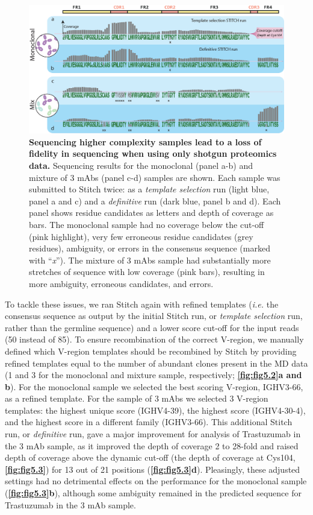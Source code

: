 \begin{figure}[!htb]
  \center
  \includegraphics[]{Chapter.5/Figures/f3.png}
  \caption{\textbf{Sequencing higher complexity samples lead to a loss of fidelity in sequencing when using only shotgun proteomics data.} Sequencing results for the monoclonal (panel a-b) and mixture of 3 mAbs (panel c-d) samples are shown. Each sample was submitted to Stitch twice: as a \emph{template selection} run (light blue, panel a and c) and a \emph{definitive} run (dark blue, panel b and d). Each panel shows residue candidates as letters and depth of coverage as bars. The monoclonal sample had no coverage below the cut-off (pink highlight), very few erroneous residue candidates (grey residues), ambiguity, or errors in the consensus sequence (marked with “\emph{x}”). The mixture of 3 mAbs sample had substantially more stretches of sequence with low coverage (pink bars), resulting in more ambiguity, erroneous candidates, and errors.}
  \label{fig:fig5.3}
\end{figure}

To tackle these issues, we ran Stitch again with refined templates (\emph{i.e.} the consensus sequence as output by the initial Stitch run, or \emph{template selection} run, rather than the germline sequence) and a lower score cut-off for the input reads (50 instead of 85). To ensure recombination of the correct V-region, we manually defined which V-region templates should be recombined by Stitch by providing refined templates equal to the number of abundant clones present in the MD data (1 and 3 for the monoclonal and mixture sample, respectively; \textbf{\autoref{fig:fig5.2}a and b}). For the monoclonal sample we selected the best scoring V-region, IGHV3-66, as a refined template. For the sample of 3 mAbs we selected 3 V-region templates: the highest unique score (IGHV4-39), the highest score (IGHV4-30-4), and the highest score in a different family (IGHV3-66). This additional Stitch run, or \emph{definitive} run, gave a major improvement for analysis of Trastuzumab in the 3 mAb sample, as it improved the depth of coverage 2 to 28-fold and raised depth of coverage above the dynamic cut-off (the depth of coverage at Cys104, \textbf{\autoref{fig:fig5.3}}) for 13 out of 21 positions (\textbf{\autoref{fig:fig5.3}d}). Pleasingly, these adjusted settings had no detrimental effects on the performance for the monoclonal sample (\textbf{\autoref{fig:fig5.3}b}), although some ambiguity remained in the predicted sequence for Trastuzumab in the 3 mAb sample.


